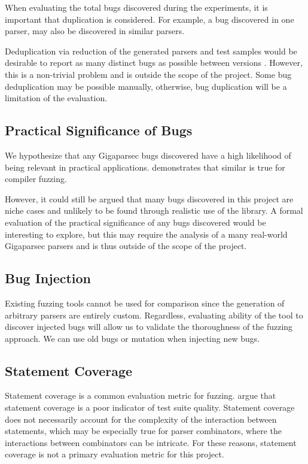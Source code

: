 \documentclass{article}
\let\oldciteauthor\citeauthor
\renewcommand{\citeauthor}[1]{\oldciteauthor{#1} \cite{#1}}
\begin{document}
When evaluating the total bugs discovered during the experiments, it is important that duplication is considered. For example, a bug discovered in one parser, may also be discovered in similar parsers.

Deduplication via reduction of the generated parsers and test samples would be desirable to report as many distinct bugs as possible between versions \cite{deduplication}. However, this is a non-trivial problem and is outside the scope of the project. Some bug deduplication may be possible manually, otherwise, bug duplication will be a limitation of the evaluation.

\subsection{Practical Significance of Bugs}

We hypothesize that any Gigaparsec bugs discovered have a high likelihood of being relevant in practical applications. \citeauthor{fuzzing-importance} demonstrates that similar is true for compiler fuzzing.

However, it could still be argued that many bugs discovered in this project are niche cases and unlikely to be found through realistic use of the library. A formal evaluation of the practical significance of any bugs discovered would be interesting to explore, but this may require the analysis of a many real-world Gigaparsec parsers and is thus outside of the scope of the project.

\subsection{Bug Injection}

Existing fuzzing tools cannot be used for comparison since the generation of arbitrary parsers are entirely custom. Regardless, evaluating ability of the tool to discover injected bugs will allow us to validate the thoroughness of the fuzzing approach. We can use old bugs or mutation when injecting new bugs.

\subsection{Statement Coverage}

Statement coverage is a common evaluation metric for fuzzing. \citeauthor{coverage} argue that statement coverage is a poor indicator of test suite quality. Statement coverage does not necessarily account for the complexity of the interaction between statements, which may be especially true for parser combinators, where the interactions between combinators can be intricate. For these reasons, statement coverage is not a primary evaluation metric for this project.
\end{document}
